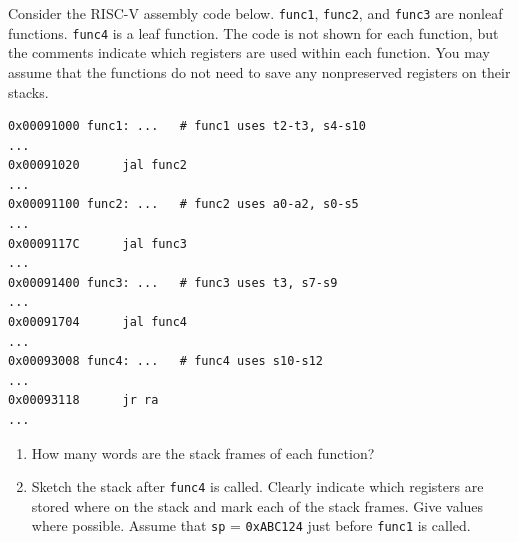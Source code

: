 \documentclass[12pt]{article}
\newenvironment{ex}[2][Exercise]{\begin{trivlist}
		\item[\hskip \labelsep {\bfseries #1}\hskip \labelsep {\bfseries #2.}]}{\end{trivlist}}
\begin{document}
\begin{ex}{6.18}
	Consider the RISC-V assembly code below. \texttt{func1}, \texttt{func2},
	and \texttt{func3} are nonleaf functions. \texttt{func4} is a leaf
	function. The code is not shown for each function, but the comments
	indicate which registers are used within each function. You may assume that the functions do not need to save any nonpreserved registers on their
	stacks.
	\begin{lstlisting}[language={}]
0x00091000 func1: ...	# func1 uses t2-t3, s4-s10
...
0x00091020 		jal func2
...
0x00091100 func2: ...	# func2 uses a0-a2, s0-s5
...
0x0009117C 		jal func3
...
0x00091400 func3: ...	# func3 uses t3, s7-s9
...
0x00091704 		jal func4
...
0x00093008 func4: ...	# func4 uses s10-s12
...
0x00093118 		jr ra
...
	\end{lstlisting}
	\begin{enumerate}[label=(\alph*)]
		\item How many words are the stack frames of each function?
		\item Sketch the stack after \texttt{func4} is called. Clearly indicate
		which registers are stored where on the stack and mark each of the
		stack frames. Give values where possible. Assume that \texttt{sp}
		= \texttt{0xABC124} just before \texttt{func1} is called.
	\end{enumerate}
\end{ex}
\end{document}
